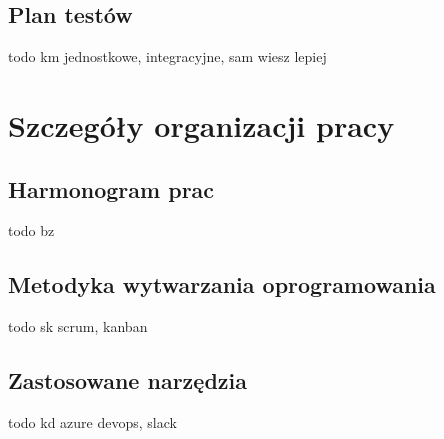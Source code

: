 \documentclass[10pt, titlepage, oneside, a4paper]{article}
\begin{document}
	\subsection{Plan testów}
	todo km jednostkowe, integracyjne, sam wiesz lepiej
	\newpage 
 
	\section{Szczegóły organizacji pracy}  
 
	\subsection{Harmonogram prac}
	todo bz
 
	\subsection{Metodyka wytwarzania oprogramowania}
	todo sk scrum, kanban
	
	\subsection{Zastosowane narzędzia}
	todo kd azure devops, slack
 
\end{document}
